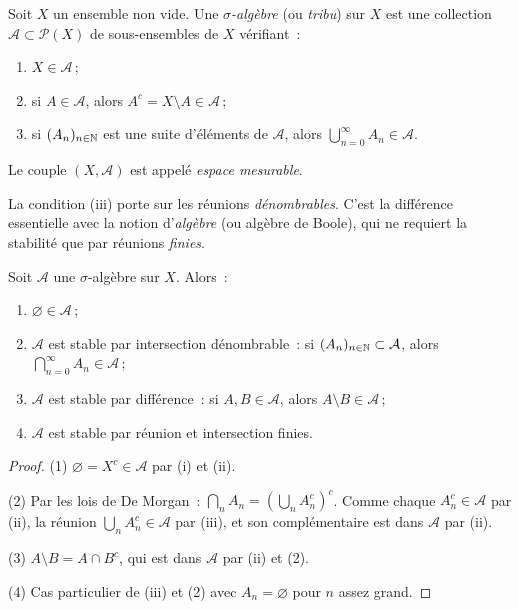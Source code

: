 \begin{definition}
Soit $X$ un ensemble non vide. Une \emph{$\sigma$-alg\`ebre} (ou \emph{tribu}) sur $X$
est une collection $\mathcal{A} \subset \mathcal{P}(X)$ de sous-ensembles de $X$
v\'erifiant~:
\begin{enumerate}
    \item[(i)] $X \in \mathcal{A}$\,;
    \item[(ii)] si $A \in \mathcal{A}$, alors $A^c = X \setminus A \in \mathcal{A}$\,;
    \item[(iii)] si $(A_n)_{n \in \mathbb{N}}$ est une suite d'\'el\'ements de $\mathcal{A}$,
    alors $\bigcup_{n=0}^{\infty} A_n \in \mathcal{A}$.
\end{enumerate}
Le couple $(X, \mathcal{A})$ est appel\'e \emph{espace mesurable}.
\end{definition}

\begin{remarque}
La condition (iii) porte sur les r\'eunions \emph{d\'enombrables}. C'est la
diff\'erence essentielle avec la notion d'\emph{alg\`ebre} (ou alg\`ebre de Boole),
qui ne requiert la stabilit\'e que par r\'eunions \emph{finies}.
\end{remarque}

\begin{proposition}
\label{prop:sigma_props}
Soit $\mathcal{A}$ une $\sigma$-alg\`ebre sur $X$. Alors~:
\begin{enumerate}
    \item $\varnothing \in \mathcal{A}$\,;
    \item $\mathcal{A}$ est stable par intersection d\'enombrable~: si
    $(A_n)_{n \in \mathbb{N}} \subset \mathcal{A}$, alors
    $\bigcap_{n=0}^{\infty} A_n \in \mathcal{A}$\,;
    \item $\mathcal{A}$ est stable par diff\'erence~: si $A, B \in \mathcal{A}$,
    alors $A \setminus B \in \mathcal{A}$\,;
    \item $\mathcal{A}$ est stable par r\'eunion et intersection finies.
\end{enumerate}
\end{proposition}

\begin{proof}
(1) $\varnothing = X^c \in \mathcal{A}$ par (i) et (ii).

(2) Par les lois de De Morgan~:
$\bigcap_{n} A_n = \left(\bigcup_{n} A_n^c\right)^c$. Comme chaque
$A_n^c \in \mathcal{A}$ par (ii), la r\'eunion $\bigcup_n A_n^c \in \mathcal{A}$
par (iii), et son compl\'ementaire est dans $\mathcal{A}$ par (ii).

(3) $A \setminus B = A \cap B^c$, qui est dans $\mathcal{A}$ par (ii) et (2).

(4) Cas particulier de (iii) et (2) avec $A_n = \varnothing$ pour $n$ assez grand.
\end{proof}


